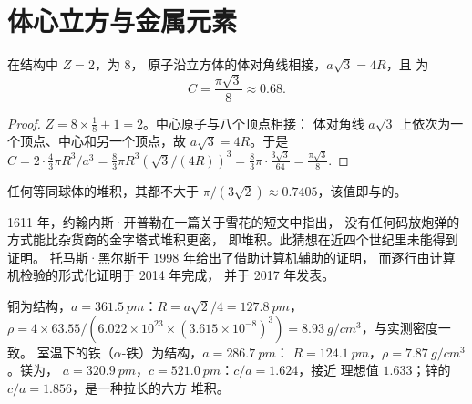 \section{体心立方与金属元素}

\begin{proposition}[体心立方]\label{prop:b1:crystals-metals:bcc}
在结构中 $Z = 2$，为 8，
原子沿立方体的体对角线相接，$a\sqrt3 = 4R$，且
为
\[
  C = \frac{\pi\sqrt3}{8} \approx 0.68 .
\]
\end{proposition}

\begin{proof}
$Z = 8 \times \frac18 + 1 = 2$。中心原子与八个顶点相接：
体对角线 $a\sqrt3$ 上依次为一个顶点、中心和另一个顶点，故
$a\sqrt3 = 4R$。于是 $C = 2 \cdot \frac43\pi R^3/a^3 =
\frac83\pi R^3 (\sqrt3/(4R))^3 = \frac83\pi \cdot \frac{3\sqrt3}{64} =
\frac{\pi\sqrt3}{8}$.
\end{proof}

\begin{proposition}[密堆积最密]\label{prop:b1:crystals-metals:kepler}
任何等同球体的堆积，其都不大于
$\pi/(3\sqrt2) \approx 0.7405$，该值即与的。
\end{proposition}
\admitted

\begin{history}[开普勒猜想，1611--2017]
1611 年，约翰内斯·开普勒在一篇关于雪花的短文中指出，
没有任何码放炮弹的方式能比杂货商的金字塔式堆积更密，
即堆积。此猜想在近四个世纪里未能得到证明。
托马斯·黑尔斯于 1998 年给出了借助计算机辅助的证明，
而逐行由计算机检验的形式化证明于 2014 年完成，
并于 2017 年发表。
\end{history}

\begin{example}[三种金属]\label{ex:b1:crystals-metals:metals}
铜为结构，$a = \qty{361.5}{pm}$：$R = a\sqrt2/4 =
\qty{127.8}{pm}$，$\rho = 4 \times 63.55/(6.022 \times 10^{23} \times
(3.615 \times 10^{-8})^3) = \qty{8.93}{g/cm^3}$，与实测密度一致。
室温下的铁（$\alpha$-铁）为结构，$a = \qty{286.7}{pm}$：
$R = \qty{124.1}{pm}$，$\rho = \qty{7.87}{g/cm^3}$。镁为，
$a = \qty{320.9}{pm}$，$c = \qty{521.0}{pm}$：$c/a = 1.624$，接近
理想值 $1.633$；锌的 $c/a = 1.856$，是一种拉长的六方
堆积。
\end{example}

